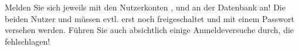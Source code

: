     \item Melden Sie sich jeweils mit den Nutzerkonten ,  und  an der Datenbank an! Die beiden Nutzer  und  müssen evtl. erst noch freigeschaltet und mit einem Passwort versehen werden. Führen Sie auch absichtlich einige Anmeldeversuche durch, die fehlschlagen!
